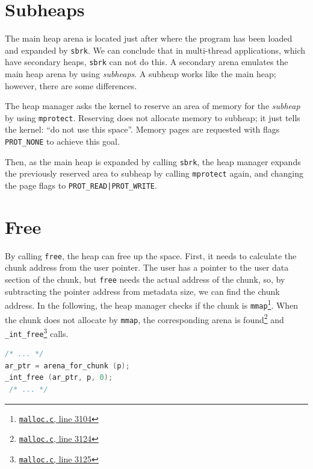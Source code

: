 \documentclass{masterthesis}
\newcommand*\sbrkc{\lstinline{sbrk}\xspace}
\begin{document}
\section{Subheaps}
\label{sect:subheaps}
The main heap arena is located just after where the program has been loaded and expanded by \sbrkc. We can conclude that in multi-thread applications, which have secondary heaps, \sbrkc can not do this. A secondary arena emulates the main heap arena by using \emph{subheaps}. A subheap works like the main heap; however, there are some differences.

The heap manager asks the kernel to reserve an area of memory for the \emph{subheap} by using \lstinline{mprotect}. Reserving does not allocate memory to subheap; it just tells the kernel: ``do not use this space''. Memory pages are requested with flags \lstinline{PROT_NONE} to achieve this goal.

Then, as the main heap is expanded by calling \sbrkc, the heap manager expands the previously reserved area to subheap by calling \lstinline{mprotect} again, and changing the page flags to \lstinline{PROT_READ|PROT_WRITE}.

\section{Free}
\label{sect:free}
By calling \lstinline{free}, the heap can free up the space. First, it needs to calculate the chunk address from the user pointer. The user has a pointer to the user data section of the chunk, but \lstinline{free} needs the actual address of the chunk, so, by subtracting the pointer address from metadata size, we can find the chunk address. In the following, the heap manager checks if the chunk is \lstinline{mmap}\footnote{\href{https://sourceware.org/git/?p=glibc.git;a=blob;f=malloc/malloc.c;h=f7cd29bc2f93e1082ee77800bd64a4b2a2897055;hb=9ea3686266dca3f004ba874745a4087a89682617\#l3104}{\texttt{malloc.c}, line 3104}}. When the chunk does not allocate by \lstinline{mmap}, the corresponding arena is found\footnote{\href{https://sourceware.org/git/?p=glibc.git;a=blob;f=malloc/malloc.c;h=f7cd29bc2f93e1082ee77800bd64a4b2a2897055;hb=9ea3686266dca3f004ba874745a4087a89682617\#l3124}{\texttt{malloc.c}, line 3124}} and \lstinline{_int_free}\footnote{\href{https://sourceware.org/git/?p=glibc.git;a=blob;f=malloc/malloc.c;h=f7cd29bc2f93e1082ee77800bd64a4b2a2897055;hb=9ea3686266dca3f004ba874745a4087a89682617\#l3125}{\texttt{malloc.c}, line 3125}} calls. 

\begin{lstlisting}[language=c,frame=single]
 /* ... */
ar_ptr = arena_for_chunk (p);
_int_free (ar_ptr, p, 0);
 /* ... */
\end{lstlisting}
\end{document}

